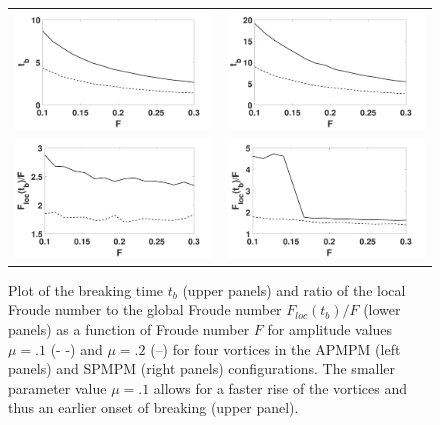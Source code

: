 \documentclass[a4paper,11pt]{article}
\begin{document}
\begin{figure}[!h]
\centering
\begin{tabular}{cc}
\includegraphics[width=.5\textwidth]{froude_comp_pmpm} & \includegraphics[width=.5\textwidth]{froude_comp_pmpm_sym}\\
\includegraphics[width=.5\textwidth]{froude_loc_pmpm} & \includegraphics[width=.5\textwidth]{froude_loc_pmpm_sym}
\end{tabular}
\caption{Plot of the breaking time $t_{b}$ (upper panels) and ratio of the local Froude number to the global Froude number $F_{loc}(t_{b})/F$ (lower panels) as a function of Froude number $F$ for amplitude values $\mu=.1$ (- -) and $\mu=.2$ (--) for four vortices in the APMPM (left panels) and SPMPM (right panels) configurations.  The smaller parameter value $\mu=.1$ allows for a faster rise of the vortices and thus an earlier onset of breaking (upper panel).}
\label{fig:froudecomp_pmpm}
\end{figure}
\end{document}
